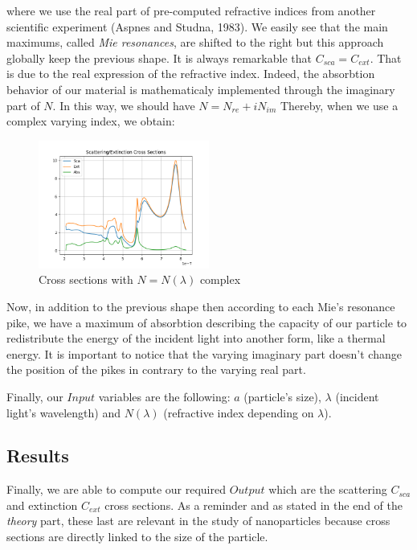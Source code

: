 \documentclass{article}
\numberwithin{equation}{section}
\begin{document}
where we use the real part of pre-computed refractive indices from another scientific experiment (Aspnes and Studna, 1983). We easily see that the main maximums, called \textit{Mie resonances}, are shifted to the right but this approach globally keep the previous shape. It is always remarkable that $C_{sca}=C_{ext}$. That is due to the real expression of the refractive index. Indeed, the absorbtion behavior of our material is mathematicaly implemented through the imaginary part of $N$. In this way, we should have $N=N_{re}+iN_{im}$ Thereby, when we use a complex varying index, we obtain:
\begin{figure}[h]
    \centering
    \includegraphics[width=0.5\textwidth, height=0.4\textwidth]{ri_var_complex.png}
    \caption{Cross sections with $N=N(\lambda)$ complex}
\end{figure}
Now, in addition to the previous shape then according to each Mie's resonance pike, we have a maximum of absorbtion describing the capacity of our particle to redistribute the energy of the incident light into another form, like a thermal energy. It is important to notice that the varying imaginary part doesn't change the position of the pikes in contrary to the varying real part.

Finally, our $Input$ variables are the following: $a$ (particle's size), $\lambda$ (incident light's wavelength) and $N(\lambda)$ (refractive index depending on $\lambda$).

\subsection{Results}

Finally, we are able to compute our required $Output$ which are the scattering $C_{sca}$ and extinction $C_{ext}$ cross sections. As a reminder and as stated in the end of the \textit{theory} part, these last are relevant in the study of nanoparticles because cross sections are directly linked to the size of the particle.
\end{document}

